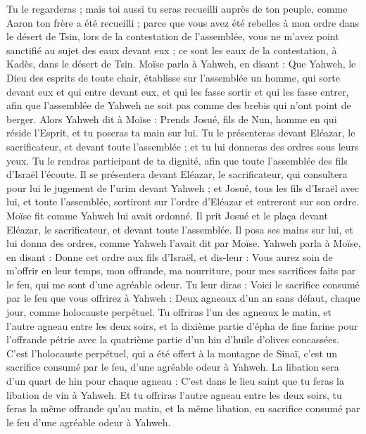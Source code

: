 \begin{multicols}{2}
Tu le regarderas ; mais toi aussi tu seras recueilli auprès de ton peuple, comme Aaron ton frère a été recueilli ;
parce que vous avez été rebelles à mon ordre dans le désert de Tsin, lors de la contestation de l'assemblée, vous ne m'avez point sanctifié au sujet des eaux devant eux ; ce sont les eaux de la contestation, à Kadès, dans le désert de Tsin.
Moïse parla à Yahweh, en disant :
Que Yahweh, le Dieu des esprits de toute chair, établisse sur l'assemblée un homme,
qui sorte devant eux et qui entre devant eux, et qui les fasse sortir et qui les fasse entrer, afin que l'assemblée de Yahweh ne soit pas comme des brebis qui n'ont point de berger.
Alors Yahweh dit à Moïse : Prends Josué, fils de Nun, homme en qui réside l'Esprit, et tu poseras ta main sur lui.
Tu le présenteras devant Eléazar, le sacrificateur, et devant toute l'assemblée ; et tu lui donneras des ordres sous leurs yeux.
Tu le rendras participant de ta dignité, afin que toute l'assemblée des fils d'Israël l'écoute.
Il se présentera devant Eléazar, le sacrificateur, qui consultera pour lui le jugement de l'urim devant Yahweh ; et Josué, tous les fils d’Israël avec lui, et toute l’assemblée, sortiront sur l’ordre d’Eléazar et entreront sur son ordre.
Moïse fit comme Yahweh lui avait ordonné. Il prit Josué et le plaça devant Eléazar, le sacrificateur, et devant toute l'assemblée.
Il posa ses mains sur lui, et lui donna des ordres, comme Yahweh l'avait dit par Moïse.
\VerseOne{}Yahweh parla à Moïse, en disant :
Donne cet ordre aux fils d'Israël, et dis-leur : Vous aurez soin de m'offrir en leur temps, mon offrande, ma nourriture, pour mes sacrifices faits par le feu, qui me sont d'une agréable odeur.
Tu leur diras : Voici le sacrifice consumé par le feu que vous offrirez à Yahweh : Deux agneaux d'un an sans défaut, chaque jour, comme holocauste perpétuel.
Tu offriras l'un des agneaux le matin, et l'autre agneau entre les deux soirs,
et la dixième partie d'épha de fine farine pour l’offrande pétrie avec la quatrième partie d'un hin d'huile d’olives concassées.
C'est l'holocauste perpétuel, qui a été offert à la montagne de Sinaï, c’est un sacrifice consumé par le feu, d’une agréable odeur à Yahweh.
La libation sera d'un quart de hin pour chaque agneau : C'est dans le lieu saint que tu feras la libation de vin à Yahweh.
Et tu offriras l'autre agneau entre les deux soirs, tu feras la même offrande qu'au matin, et la même libation, en sacrifice consumé par le feu d’une agréable odeur à Yahweh.

\end{multicols}
